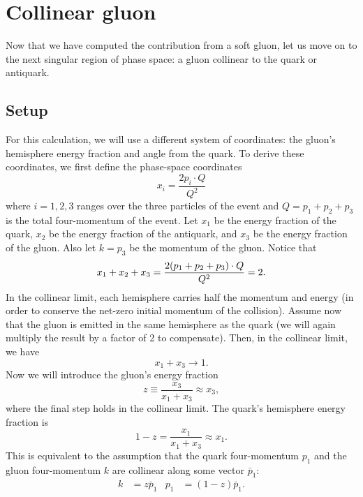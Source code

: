 \documentclass[../thesis.tex]{subfiles}
\begin{document}
\section{Collinear gluon}
	Now that we have computed the contribution from a soft gluon, let us move on to the next singular region of phase space: a gluon collinear to the quark or antiquark. 

\subsection{Setup}
	For this calculation, we will use a different system of coordinates: the gluon's hemisphere energy fraction and angle from the quark. To derive these coordinates, we first define the phase-space coordinates
	\begin{equation}
		x_i = \frac{2 p_i \cdot Q}{Q^2}
	\end{equation}
	where $i = 1, 2, 3$ ranges over the three particles of the event and $Q = p_1 + p_2 + p_3$ is the total four-momentum of the event. Let $x_1$ be the energy fraction of the quark, $x_2$ be the energy fraction of the antiquark, and $x_3$ be the energy fraction of the gluon. Also let $k = p_3$ be the momentum of the gluon. Notice that
	\begin{equation}
		x_1 + x_2 + x_3 = \frac{2\qty(p_1 + p_2 + p_3)\cdot Q}{Q^2} = 2.
	\end{equation}
	In the collinear limit, each hemisphere carries half the momentum and energy (in order to conserve the net-zero initial momentum of the collision). Assume now that the gluon is emitted in the same hemisphere as the quark (we will again multiply the result by a factor of 2 to compensate). Then, in the collinear limit, we have
	\begin{equation}
		x_1 + x_3 \to 1.
	\end{equation}
	Now we will introduce the gluon's energy fraction
	\begin{equation}
		z \equiv \frac{x_3}{x_1 + x_3} \approx x_3,
	\end{equation}
	where the final step holds in the collinear limit. The quark's hemisphere energy fraction is
	\begin{equation}
		1 - z = \frac{x_1}{x_1 + x_3} \approx x_1.
	\end{equation}
	This is equivalent to the assumption that the quark four-momentum $p_1$ and the gluon four-momentum $k$ are collinear along some vector $\bar p_1$:
	\begin{align}
		k &= z \bar p_1 & p_1 &= (1 - z)\bar p_1.
	\end{align}
\end{document}
